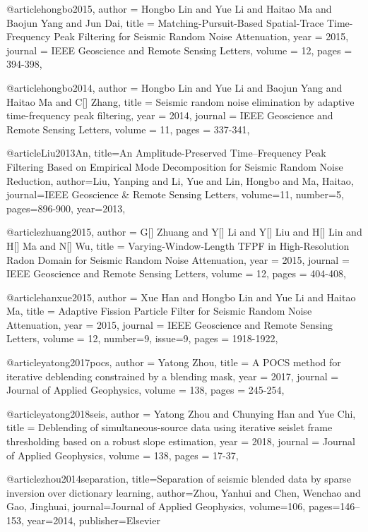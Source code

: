 @article{hongbo2015,
  author =	 {Hongbo Lin and Yue Li and Haitao Ma and Baojun Yang and Jun Dai},
  title =	 {Matching-Pursuit-Based Spatial-Trace Time-Frequency Peak Filtering for Seismic Random Noise Attenuation},
  year =	 2015,
  journal =	 {IEEE Geoscience and Remote Sensing Letters},
  volume =	 12,
  pages =	 {394-398},
}

@article{hongbo2014,
  author =	 {Hongbo Lin and Yue Li and Baojun Yang and Haitao Ma and C[] Zhang},
  title =	 { Seismic random noise elimination by adaptive time-frequency peak filtering},
  year =	 2014,
  journal =	 {IEEE Geoscience and Remote Sensing Letters},
  volume =	 11,
  pages =	 {337-341},
}

@article{Liu2013An,
  title={An Amplitude-Preserved Time–Frequency Peak Filtering Based on Empirical Mode Decomposition for Seismic Random Noise Reduction},
  author={Liu, Yanping and Li, Yue and Lin, Hongbo and Ma, Haitao},
  journal={IEEE Geoscience \& Remote Sensing Letters},
  volume={11},
  number={5},
  pages={896-900},
  year={2013},
}

@article{zhuang2015,
  author =	 {G[] Zhuang and Y[] Li and Y[] Liu and H[] Lin and H[] Ma and N[] Wu},
  title =	 {Varying-Window-Length {TFPF} in High-Resolution Radon Domain for Seismic Random Noise Attenuation},
  year =	 2015,
  journal =	 {IEEE Geoscience and Remote Sensing Letters},
  volume =	 12,
  pages =	 {404-408},
}

@article{hanxue2015,
  author =	 {Xue Han and Hongbo Lin and Yue Li and Haitao Ma},
  title =	 {Adaptive Fission Particle Filter for Seismic Random Noise Attenuation},
  year =	 2015,
  journal =	 {IEEE Geoscience and Remote Sensing Letters},
  volume =	 12,
  number=9,
  issue=9,
  pages =	 {1918-1922},
}

@article{yatong2017pocs,
  author =	 {Yatong Zhou},
  title =	 {A {POCS} method for iterative deblending constrained by a blending mask},
  year =	 2017,
  journal =	 {Journal of Applied Geophysics},
  volume =	 138,
  pages =	 {245-254},
}

@article{yatong2018seis,
  author =	 {Yatong Zhou and Chunying Han and Yue Chi},
  title =	 {Deblending of simultaneous-source data using iterative seislet frame thresholding based on a robust slope estimation},
  year =	 2018,
  journal =	 {Journal of Applied Geophysics},
  volume =	 138,
  pages =	 {17-37},
}

@article{zhou2014separation,
  title={Separation of seismic blended data by sparse inversion over dictionary learning},
  author={Zhou, Yanhui and Chen, Wenchao and Gao, Jinghuai},
  journal={Journal of Applied Geophysics},
  volume={106},
  pages={146--153},
  year={2014},
  publisher={Elsevier}
}


